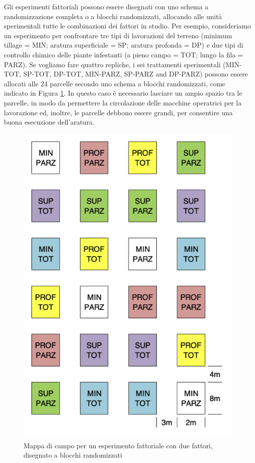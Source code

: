 \documentclass[a4paper,12pt,oneside]{book}
\begin{document}
Gli esperimenti fattoriali possono essere disegnati con uno schema a randomizzazione completa o a blocchi randomizzati, allocando alle unità sperimentali tutte le combinazioni dei fattori in studio. Per esempio, consideriamo un esperimento per confrontare tre tipi di lavorazioni del terreno (minimum tillage = MIN; aratura superficiale = SP; aratura profonda = DP) e due tipi di controllo chimico delle piante infestanti (a pieno campo = TOT; lungo la fila = PARZ). Se vogliamo fare quattro repliche, i sei trattamenti sperimentali (MIN-TOT, SP-TOT, DP-TOT, MIN-PARZ, SP-PARZ and DP-PARZ) possono essere allocati alle 24 parcelle secondo uno schema a blocchi randomizzati, come indicato in Figura \ref{fig:figName37}. In questo caso è necessario lasciare un ampio spazio tra le parcelle, in modo da permettere la circolazione delle macchine operatrici per la lavorazione ed, inoltre, le parcelle debbono essere grandi, per consentire una buona esecuzione dell'aratura.

\begin{figure}

{\centering \includegraphics[width=0.75\linewidth]{_images/Mappa3FATT} 

}

\caption{Mappa di campo per un esperimento fattoriale con due fattori, disegnato a blocchi randomizzati}\label{fig:figName37}
\end{figure}
\end{document}
